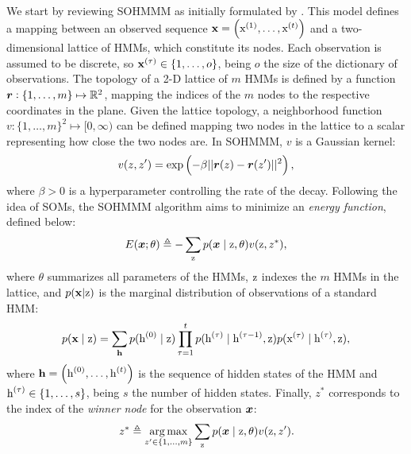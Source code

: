 We start by reviewing SOHMMM as initially formulated by \citet{Ferles2008}. This model defines a mapping between an observed sequence ${\mathbf{x}} = \left({\textnormal{x}}^{(1)}, \dots, {\textnormal{x}}^{(t)} \right)$ and a two-dimensional lattice of HMMs, which constitute its nodes. Each observation is assumed to be discrete, so ${\mathbf{x}}^{(\tau)} \in \{1,\dots,o\}$, being $o$ the size of the dictionary of observations. The topology of a 2-D lattice of $m$ HMMs is defined by a function ${\bm{r}}: \{1, \dots, m\} \mapsto \mathbb{R}^2$, mapping the indices of the $m$ nodes to the respective coordinates in the plane. Given the lattice topology, a neighborhood function $v: \{1, \dots, m\}^2 \mapsto [0, \infty)$ can be defined mapping two nodes in the lattice to a scalar representing how close the two nodes are. In SOHMMM, $v$ is a Gaussian kernel:
\begin{equation}
\label{eq:sohmmm_distance}
v(z,z') = \exp\left(-\beta||{\bm{r}}(z)-{\bm{r}}(z')||^{2}\right),
\end{equation}
where $\beta > 0$ is a hyperparameter controlling the rate of the decay.
Following the idea of SOMs, the SOHMMM algorithm aims to minimize an \emph{energy function}, defined below:
\begin{equation}
\label{eq:sohmmm_energy}
E({\bm{x}}; \theta) \triangleq -\sum_{{\textnormal{z}}} p({\bm{x}} \mid {\textnormal{z}}, \theta)v({\textnormal{z}}, z^*),
\end{equation}
where $\theta$ summarizes all parameters of the HMMs, ${\textnormal{z}}$ indexes the $m$ HMMs in the lattice, and $p({\mathbf{x}} | {\textnormal{z}})$ is the marginal distribution of observations of a standard HMM:
\begin{equation}
\label{eq:sohmmm_hmm}
p({\mathbf{x}} \mid {\textnormal{z}}) = \sum_{{\mathbf{h}}} p({\textnormal{h}}^{(0)} \mid {\textnormal{z}}) \prod_{\tau=1}^t p({\textnormal{h}}^{(\tau)} \mid {\textnormal{h}}^{(\tau-1)},{\textnormal{z}}) p({\textnormal{x}}^{(\tau)} \mid {\textnormal{h}}^{(\tau)},{\textnormal{z}}),
\end{equation}
where ${\mathbf{h}} = \left({\textnormal{h}}^{(0)},\dots,{\textnormal{h}}^{(t)}\right)$ is the sequence of hidden states of the HMM and ${\textnormal{h}}^{(\tau)} \in \{1, \dots, s\}$, being $s$ the number of hidden states. Finally, $z^*$ corresponds to the index of the \emph{winner node} for the observation ${\bm{x}}$:
\begin{equation}
\label{eq:sohmmm_winner}
z^* \triangleq \operatorname*{arg\,max}_{z' \in \{1,\dots,m\}} \sum_{{\textnormal{z}}} p({\bm{x}} \mid {\textnormal{z}}, \theta)v({\textnormal{z}}, z').
\end{equation}

